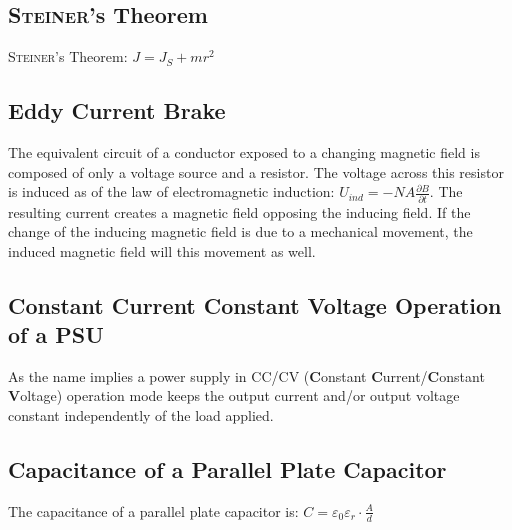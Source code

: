     \subsection*{\textsc{Steiner}'s Theorem}
        \textsc{Steiner}'s Theorem: \(J = J_S + mr^2\)
    \subsection*{Eddy Current Brake}
        The equivalent circuit of a conductor exposed to a changing magnetic field is composed of only a voltage source
        and a resistor. The voltage across this resistor is induced as of the law of electromagnetic induction: \(U_{ind} = -NA\frac{\partial B}{\partial t}\).
        The resulting current creates a magnetic field opposing the inducing field. If the change of the inducing magnetic
        field is due to a mechanical movement, the induced magnetic field will this movement as well.
    \subsection*{Constant Current Constant Voltage Operation of a PSU}
        As the name implies a power supply in CC/CV (\textbf{C}onstant \textbf{C}urrent/\textbf{C}onstant \textbf{V}oltage)
        operation mode keeps the output current and/or output voltage constant independently of the load applied.
    \subsection*{Capacitance of a Parallel Plate Capacitor}
        The capacitance of a parallel plate capacitor is: \(C = \varepsilon_0 \varepsilon_r \cdot \frac{A}{d}\)
